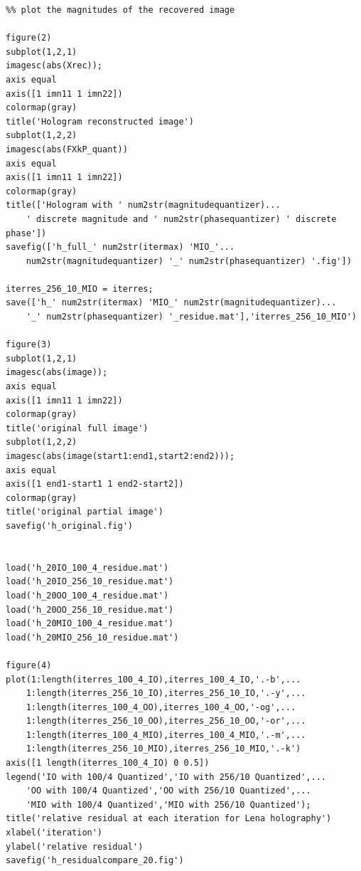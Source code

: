 \documentclass[letter,14pt]{extreport}
\begin{document}
\begin{appendices}
\begin{lstlisting}
%% plot the magnitudes of the recovered image

figure(2)
subplot(1,2,1)
imagesc(abs(Xrec));
axis equal
axis([1 imn11 1 imn22])
colormap(gray)
title('Hologram reconstructed image')
subplot(1,2,2)
imagesc(abs(FXkP_quant))
axis equal
axis([1 imn11 1 imn22])
colormap(gray)
title(['Hologram with ' num2str(magnitudequantizer)...
    ' discrete magnitude and ' num2str(phasequantizer) ' discrete phase'])
savefig(['h_full_' num2str(itermax) 'MIO_'... 
    num2str(magnitudequantizer) '_' num2str(phasequantizer) '.fig'])

iterres_256_10_MIO = iterres;
save(['h_' num2str(itermax) 'MIO_' num2str(magnitudequantizer)...
    '_' num2str(phasequantizer) '_residue.mat'],'iterres_256_10_MIO')

figure(3)
subplot(1,2,1)
imagesc(abs(image));
axis equal
axis([1 imn11 1 imn22])
colormap(gray)
title('original full image')
subplot(1,2,2)
imagesc(abs(image(start1:end1,start2:end2)));
axis equal
axis([1 end1-start1 1 end2-start2])
colormap(gray)
title('original partial image')
savefig('h_original.fig')


load('h_20IO_100_4_residue.mat')
load('h_20IO_256_10_residue.mat')
load('h_20OO_100_4_residue.mat')
load('h_20OO_256_10_residue.mat')
load('h_20MIO_100_4_residue.mat')
load('h_20MIO_256_10_residue.mat')

figure(4)
plot(1:length(iterres_100_4_IO),iterres_100_4_IO,'.-b',...
    1:length(iterres_256_10_IO),iterres_256_10_IO,'.-y',...
    1:length(iterres_100_4_OO),iterres_100_4_OO,'-og',...
    1:length(iterres_256_10_OO),iterres_256_10_OO,'-or',...
    1:length(iterres_100_4_MIO),iterres_100_4_MIO,'.-m',...
    1:length(iterres_256_10_MIO),iterres_256_10_MIO,'.-k')
axis([1 length(iterres_100_4_IO) 0 0.5])
legend('IO with 100/4 Quantized','IO with 256/10 Quantized',...
    'OO with 100/4 Quantized','OO with 256/10 Quantized',...
    'MIO with 100/4 Quantized','MIO with 256/10 Quantized');
title('relative residual at each iteration for Lena holography')
xlabel('iteration')
ylabel('relative residual')
savefig('h_residualcompare_20.fig')

\end{lstlisting}
\end{appendices}
\end{document}
